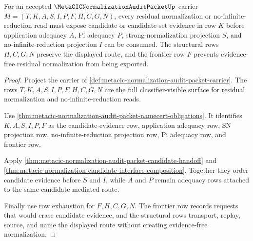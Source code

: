 \begin{theorem}
\label{thm:metacic-normalization-audit-packet-residual-candidate-route}
For an accepted $\MetaCICNormalizationAuditPacketUp$ carrier $M=(T,K,A,S,I,P,F,H,C,G,N)$, every residual normalization or no-infinite-reduction read must expose candidate or candidate-set evidence in row $K$ before application adequacy $A$, Pi adequacy $P$, strong-normalization projection $S$, and no-infinite-reduction projection $I$ can be consumed. The structural rows $H,C,G,N$ preserve the displayed route, and the frontier row $F$ prevents evidence-free residual normalization from being exported.
\end{theorem}
\begin{proof}
Project the carrier of \autoref{def:metacic-normalization-audit-packet-carrier}. The rows $T,K,A,S,I,P,F,H,C,G,N$ are the full classifier-visible surface for residual normalization and no-infinite-reduction reads.

Use \autoref{thm:metacic-normalization-audit-packet-namecert-obligations}. It identifies $K,A,S,I,P,F$ as the candidate-evidence row, application adequacy row, SN projection row, no-infinite-reduction projection row, Pi adequacy row, and frontier row.

Apply \autoref{thm:metacic-normalization-audit-packet-candidate-handoff} and \autoref{thm:metacic-normalization-candidate-interface-composition}. Together they order candidate evidence before $S$ and $I$, while $A$ and $P$ remain adequacy rows attached to the same candidate-mediated route.

Finally use row exhaustion for $F,H,C,G,N$. The frontier row records requests that would erase candidate evidence, and the structural rows transport, replay, source, and name the displayed route without creating evidence-free normalization.
\end{proof}



